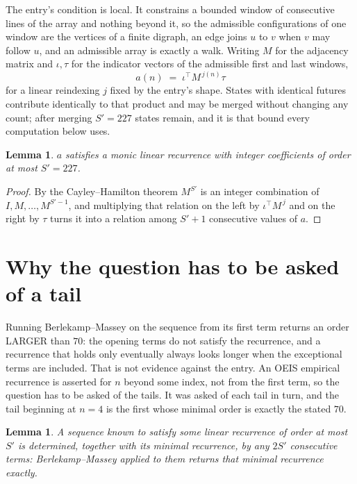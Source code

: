 \documentclass[11pt,a4paper]{article}
\theoremstyle{plain}
\newtheorem{lemma}[theorem]{Lemma}
\theoremstyle{definition}
\begin{document}
The entry's condition is local. It constrains a bounded window of consecutive lines of the
array and nothing beyond it, so the admissible configurations of one window are the vertices of
a finite digraph, an edge joins $u$ to $v$ when $v$ may follow $u$, and an admissible array is
exactly a walk. Writing $M$ for the adjacency matrix and $\iota,\tau$ for the indicator vectors
of the admissible first and last windows,
\[
a(n)\;=\;\iota^{\!\top}M^{\,j(n)}\tau
\]
for a linear reindexing $j$ fixed by the entry's shape. States with identical futures
contribute identically to that product and may be merged without changing any count; after
merging $S'=227$ states remain, and it is that bound every computation below uses.

\begin{lemma}\label{lem:cf}
$a$ satisfies a monic linear recurrence with integer coefficients of order at most $S'=227$.
\end{lemma}

\begin{proof}
By the Cayley--Hamilton theorem $M^{S'}$ is an integer combination of $I,M,\dots,M^{S'-1}$,
and multiplying that relation on the left by $\iota^{\!\top}M^{\,j}$ and on the right by
$\tau$ turns it into a relation among $S'+1$ consecutive values of $a$.
\end{proof}

\section{Why the question has to be asked of a tail}

Running Berlekamp--Massey on the sequence from its first term returns an order LARGER than $70$: the opening terms do not satisfy the recurrence, and a recurrence that holds only eventually always looks longer when the exceptional terms are included. That is not evidence against the entry. An OEIS empirical recurrence is asserted for $n$ beyond some index, not from the first term, so the question has to be asked of the tails. It was asked of each tail in turn, and the tail beginning at $n=4$ is the first whose minimal order is exactly the stated $70$.

\begin{lemma}\label{lem:bm}
A sequence known to satisfy some linear recurrence of order at most $S'$ is determined,
together with its minimal recurrence, by any $2S'$ consecutive terms: Berlekamp--Massey applied
to them returns that minimal recurrence exactly.
\end{lemma}
\end{document}
